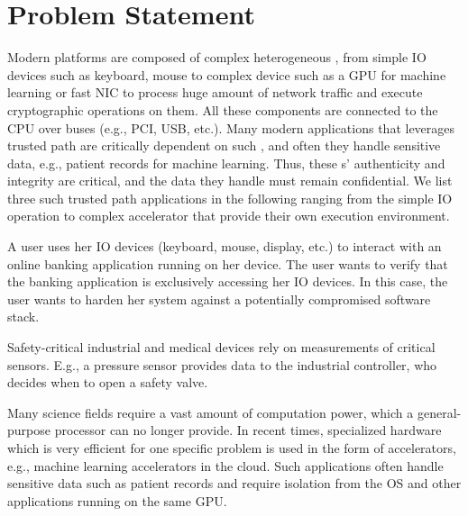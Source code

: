 \section{Problem Statement}
\label{pie:sec:problemStatement}

Modern platforms are composed of complex heterogeneous \sphw, from simple IO devices such as keyboard, mouse to complex device such as a GPU for machine learning or fast NIC to process huge amount of network traffic and execute cryptographic operations on them. All these components are connected to the CPU over buses (e.g., PCI, USB, etc.). Many modern applications that leverages trusted path are critically dependent on such \sphw, and often they handle sensitive data, e.g., patient records for machine learning. Thus, these \sphw{}s' authenticity and integrity are critical, and the data they handle must remain confidential. We list three such trusted path applications in the following ranging from the simple IO operation to complex accelerator that provide their own execution environment. 


 A user uses her IO devices (keyboard, mouse, display, etc.) to interact with an online banking application running on her device. The user wants to verify that the banking application is exclusively accessing her IO devices. In this case, the user wants to harden her system against a potentially compromised software stack.

Safety-critical industrial and medical devices rely on measurements of critical sensors. E.g., a pressure sensor provides data to the industrial controller, who decides when to open a safety valve.


Many science fields require a vast amount of computation power, which a general-purpose processor can no longer provide. In recent times, specialized hardware which is very efficient for one specific problem is used in the form of accelerators, e.g., machine learning accelerators in the cloud. Such applications often handle sensitive data such as patient records and require isolation from the OS and other applications running on the same GPU. 

